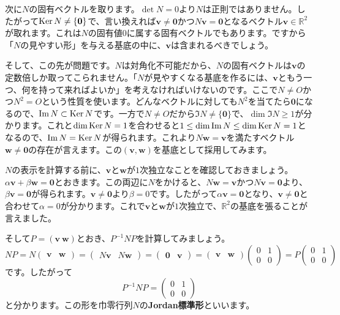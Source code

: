 次に$N$の固有ベクトルを取ります。$\det N = 0$より$N$は正則ではありません。したがって$\operatorname{Ker} N \neq \{\boldsymbol{0}\}$で、言い換えれば$\bm{v} \neq \bm{0}$かつ$N\bm{v} = \bm{0}$となるベクトル$\bm{v} \in \mathbb{R}^2$が取れます。これは$N$の固有値$0$に属する固有ベクトルでもあります。ですから「$N$の見やすい形」を与える基底の中に、$\bm{v}$は含まれるべきでしょう。

そして、この先が問題です。$N$は対角化不可能だから、$N$の固有ベクトルは$\bm{v}$の定数倍しか取ってこられません。「$N$が見やすくなる基底を作るには、$\bm{v}$ともう一つ、何を持って来ればよいか」を考えなければいけないのです。ここで$N \neq O$かつ$N^2 = O$という性質を使います。どんなベクトルに対しても$N^2$を当てたら$\bm{0}$になるので、$\mathrm{Im}\, N \subset \operatorname{Ker} N$です。一方で$N \neq O$だから$\Im N \neq \{\bm{0}\}$で、$\dim \Im N \geq 1$が分かります。これと$\dim \operatorname{Ker} N = 1$を合わせると$1 \leq \dim \mathrm{Im}\, N \leq \dim \operatorname{Ker} N = 1$となるので、$\mathrm{Im}\, N = \operatorname{Ker} N$が得られます。これより$N\bm{w} = \bm{v}$を満たすベクトル$\bm{w} \neq \bm{0}$の存在が言えます。この$(\bm{v}, \bm{w})$を基底として採用してみます。

$N$の表示を計算する前に、$\bm{v}$と$\bm{w}$が$1$次独立なことを確認しておきましょう。$\alpha \bm{v} + \beta \bm{w} = \bm{0}$とおきます。この両辺に$N$をかけると、$N\bm{w} = \bm{v}$かつ$N\bm{v} = \bm{0}$より、$\beta \bm{v} = \bm{0}$が得られます。$\bm{v} \neq \bm{0}$より$\beta = 0$です。したがって$\alpha \bm{v} = \bm{0}$となり、$\bm{v} \neq \bm{0}$と合わせて$\alpha = 0$が分かります。これで$\bm{v}$と$\bm{w}$が$1$次独立で、$\mathbb{R}^2$の基底を張ることが言えました。

そして$P = (\bm{v} \ \bm{w})$とおき、$P^{-1}NP$を計算してみましょう。
\[
NP = 
N
\begin{pmatrix}
\bm{v} & \bm{w}
\end{pmatrix}
=
\begin{pmatrix}
N\bm{v} & N\bm{w}
\end{pmatrix}
= 
\begin{pmatrix}
\bm{0} & \bm{v}
\end{pmatrix}
=
\begin{pmatrix}
\bm{v} & \bm{w}
\end{pmatrix}
\begin{pmatrix}
0 & 1 \\
0 & 0
\end{pmatrix}
=
P
\begin{pmatrix}
0 & 1 \\
0 & 0
\end{pmatrix}
\]
です。したがって
\[
P^{-1} N P =
\begin{pmatrix}
0 & 1 \\
0 & 0 
\end{pmatrix}
\]
と分かります。この形を巾零行列$N$の\textbf{Jordan標準形}といいます。

